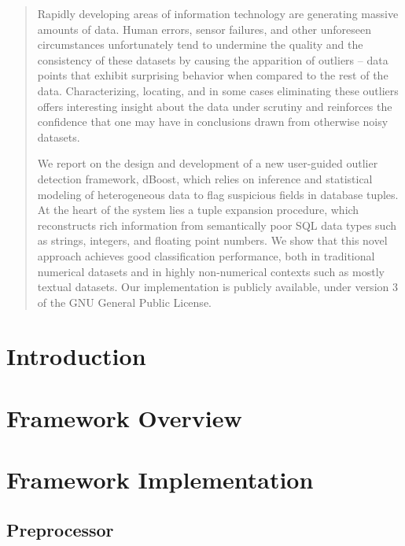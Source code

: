 \documentclass{vldb}
\begin{document}
\maketitle

\begin{abstract}
Rapidly developing areas of information technology are generating massive amounts of data. Human errors, sensor failures, and other unforeseen circumstances unfortunately tend to undermine the quality and the consistency of these datasets by causing the apparition of outliers -- data points that exhibit surprising behavior when compared to the rest of the data. Characterizing, locating, and in some cases eliminating these outliers offers interesting insight about the data under scrutiny and reinforces the confidence that one may have in conclusions drawn from otherwise noisy datasets.

We report on the design and development of a new user-guided outlier detection framework, dBoost, which relies on inference and statistical modeling of heterogeneous data to flag suspicious fields in database tuples. At the heart of the system lies a tuple expansion procedure, which reconstructs rich information from semantically poor SQL data types such as strings, integers, and floating point numbers. We show that this novel approach achieves good classification performance, both in traditional numerical datasets and in highly non-numerical contexts such as mostly textual datasets. Our implementation is publicly available, under version 3 of the GNU General Public License.
\end{abstract}

\section{Introduction}
\label{sec:intro}


\section{Framework Overview}
\label{sec:overview}

\section{Framework Implementation}
\label{sec:implementation}
\subsection{Preprocessor}
\label{sec:preproc}

\end{document}
